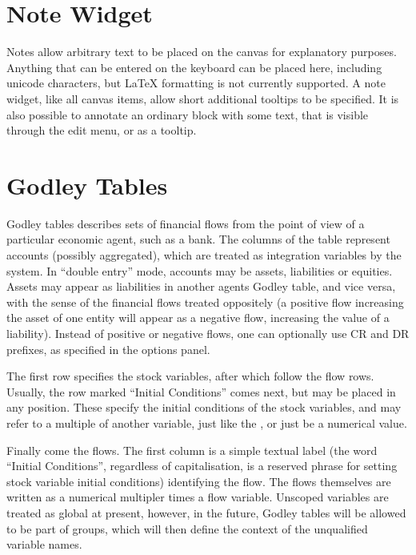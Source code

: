 \section{Note Widget}
 \label{Notes} Notes allow arbitrary text to be
placed on the canvas for explanatory purposes. Anything that can be
entered on the keyboard can be placed here, including unicode
characters, but LaTeX formatting is not currently supported. A note
widget, like all canvas items, allow short additional tooltips to be
specified. It is also possible to annotate an ordinary block with some text,
that is visible through the edit menu, or as a tooltip.

\section{Godley Tables}\label{godley}

Godley tables describes sets of financial flows from the point of view
of a particular economic agent, such as a bank. The columns of the
table represent accounts (possibly aggregated), which are treated as
integration variables by the system. In ``double entry'' mode,
accounts may be assets, liabilities or equities. Assets may appear as
liabilities in another agents Godley table, and vice versa, with the
sense of the financial flows treated oppositely (a positive flow increasing the
asset of one entity will appear as a negative flow, increasing the
value of a liability). Instead of positive or negative flows, one can
optionally use CR and DR prefixes, as specified in the options panel.

The first row specifies the stock variables, after which follow the
flow rows. Usually, the row marked ``Initial Conditions'' comes next,
but may be placed in any position. These specify the initial
conditions of the stock variables, and may refer to a multiple of
another variable, just like the , or just be a numerical value.

Finally come the flows. The first column is a simple textual label
(the word ``Initial Conditions'', regardless of capitalisation, is a
reserved phrase for setting stock variable initial conditions)
identifying the flow. The flows themselves are written as a numerical
multipler times a flow variable. Unscoped variables are treated as
global at present, however, in the future, Godley tables will be
allowed to be part of groups, which will then define the context of
the unqualified variable names.

